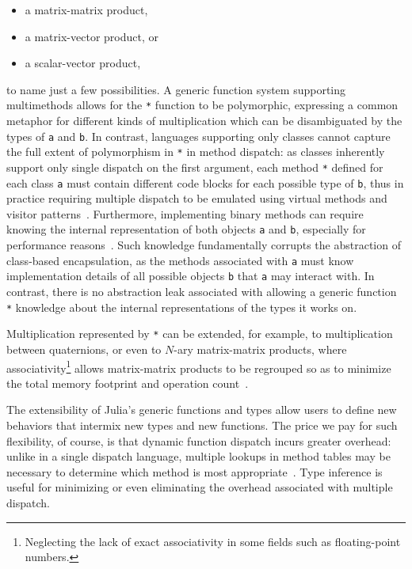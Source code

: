 \documentclass[10pt, preprint]{sigplanconf}
\begin{document}
\begin{itemize}
	\item a matrix-matrix product,
	\item a matrix-vector product, or
	\item a scalar-vector product,
\end{itemize}
%
to name just a few possibilities. A generic function system supporting
multimethods allows for the \verb|*| function to be polymorphic, expressing a
common metaphor for different kinds of multiplication which can be
disambiguated by the types of \verb|a| and \verb|b|. In contrast, languages
supporting only classes cannot capture the full extent of polymorphism in
\verb|*| in method dispatch: as classes inherently support only single dispatch
on the first argument, each method \verb|*| defined for each class \verb|a|
must contain different code blocks for each possible type of \verb|b|, thus in
practice requiring multiple dispatch to be emulated using virtual methods and
visitor patterns~\cite{designpatterns}. Furthermore, implementing binary methods can
require knowing the internal representation of both objects \verb|a| and
\verb|b|, especially for performance reasons~\cite{Bruce1995}. Such knowledge
fundamentally corrupts the abstraction of class-based encapsulation, as the
methods associated with \verb|a| must know implementation details of all
possible objects \verb|b| that \verb|a| may interact with.
In contrast, there is no abstraction leak associated with allowing a generic
function \verb|*| knowledge about the internal representations of the types it
works on.

Multiplication represented by \verb|*| can be extended, for
example, to multiplication between quaternions, or even to $N$-ary
matrix-matrix products, where associativity\footnote{Neglecting the lack of
exact associativity in some fields such as floating-point numbers.} allows
matrix-matrix products to be regrouped so as to minimize the total memory
footprint and operation count~\cite{Hu1984}.

The extensibility of Julia's generic functions and types allow users to
define new behaviors that intermix new types and new functions. The price we pay
for such flexibility, of course, is that dynamic function dispatch incurs
greater overhead: unlike in a single dispatch language, multiple lookups in
method tables may be necessary to determine which method is most
appropriate~\cite{Bruce1995}. Type inference is
useful for minimizing or even eliminating the
overhead associated with multiple dispatch.
\end{document}

